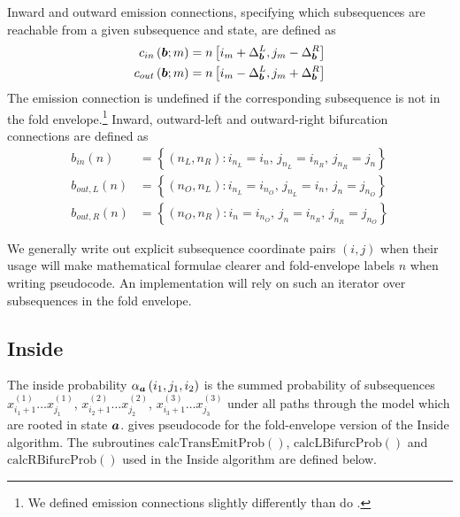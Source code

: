 \documentclass[10pt]{article}
\begin{document}
Inward and outward emission connections, specifying which subsequences are reachable from 
a given subsequence and state, are defined as
\begin{align}
c_{in}\left(\bvec{b}; m\right) &= n\left[ i_{m} + \Delta_{\bvec{b}}^{L}, j_{m} - \Delta_{\bvec{b}}^{R} \right] \\
c_{out}\left(\bvec{b}; m\right) &= n\left[ i_{m} - \Delta_{\bvec{b}}^{L}, j_{m} + \Delta_{\bvec{b}}^{R} \right]
\end{align}
The emission connection is undefined if the corresponding subsequence is not in the fold envelope.\footnote{We defined emission connections slightly differently than do \cite{HolmesRubin2002a}.}  Inward, outward-left and outward-right bifurcation connections are defined as
\begin{align}
b_{in}(n) &= \left\{ \left( n_L,n_R \right): i_{n_L} = i_{n},\, j_{n_L} = i_{n_R},\, j_{n_R} = j_{n} \right\} \\
b_{out,L}(n) &= \left\{ \left( n_O,n_L \right): i_{n_L} = i_{n_O},\, j_{n_L} = i_{n},\, j_{n} = j_{n_O} \right\} \\
b_{out,R}(n) &= \left\{ \left( n_O,n_R \right): i_{n} = i_{n_O},\, j_{n} = i_{n_R},\, j_{n_R} = j_{n_O} \right\}
\end{align}

We generally write out explicit subsequence coordinate pairs $(i,j)$ when their usage will make mathematical formulae clearer and 
fold-envelope labels $n$ when writing pseudocode.  An implementation will rely on such an iterator over subsequences in the fold envelope.

\subsection{Inside}
The inside probability $\inside{\bvec{a}}{i_1}{j_1}{i_2}{j_2}{i_3}{j_3}$ is the summed probability of subsequences 
$x^{(1)}_{i_1+1} \dots x^{(1)}_{j_1}$, $x^{(2)}_{i_2+1} \dots x^{(2)}_{j_2}$, $x^{(3)}_{i_3+1} \dots x^{(3)}_{j_3}$
under all paths through the model which are rooted in state $\bvec{a}$.  
 gives pseudocode for the fold-envelope version of the Inside algorithm.  The subroutines 
$\mathrm{calcTransEmitProb}()$, $\mathrm{calcLBifurcProb}()$ and $\mathrm{calcRBifurcProb}()$
used in the Inside algorithm are defined below.
\end{document}

